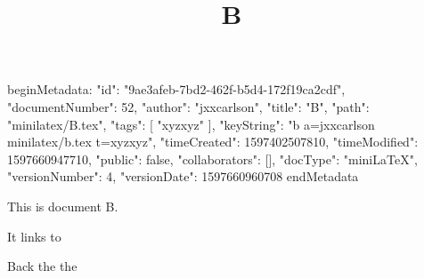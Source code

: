 beginMetadata:
{
    "id": "9ae3afeb-7bd2-462f-b5d4-172f19ca2cdf",
    "documentNumber": 52,
    "author": "jxxcarlson",
    "title": "B",
    "path": "minilatex/B.tex",
    "tags": [
        "xyzxyz"
    ],
    "keyString": "b a=jxxcarlson minilatex/b.tex t=xyzxyz",
    "timeCreated": 1597402507810,
    "timeModified": 1597660947710,
    "public": false,
    "collaborators": [],
    "docType": "miniLaTeX",
    "versionNumber": 4,
    "versionDate": 1597660960708
}
endMetadata
\title{B}

\maketitle

This is document B.

It links to 


Back the the 



